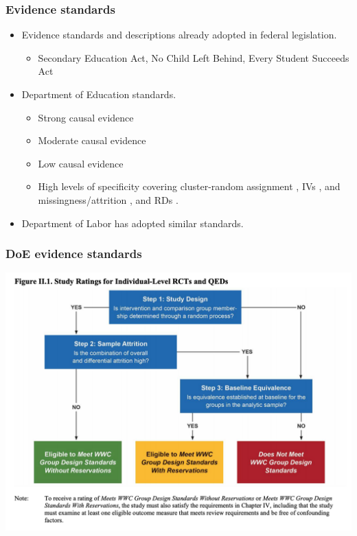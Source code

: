 \documentclass[usenames,dvipsnames]{beamer}
\begin{document}
\begin{frame}
\frametitle{Evidence standards}

\begin{itemize}
\item Evidence standards and descriptions already adopted in federal legislation.
\begin{itemize}
\item Secondary Education Act, No Child Left Behind, Every Student Succeeds Act
\end{itemize}
\pause
\item Department of Education standards.
\begin{itemize}
\item Strong causal evidence
\item Moderate causal evidence
\item Low causal evidence
\item High levels of specificity covering cluster-random assignment \hyperlink{doe_cluster}{}, IVs \hyperlink{doe_iv}{}, and missingness/attrition \hyperlink{doe_missing}{}, and RDs \hyperlink{doe_rd}{}. 
\end{itemize}
\pause
\item Department of Labor has adopted similar standards.
\end{itemize}

\end{frame}


\begin{frame}
\frametitle{DoE evidence standards}

\begin{center}
\vspace{-0.85cm}
\hspace*{-1cm}
\includegraphics[scale=0.57]{../figs/DoE_standards.png} 
\end{center}


\end{frame}
\end{document}
